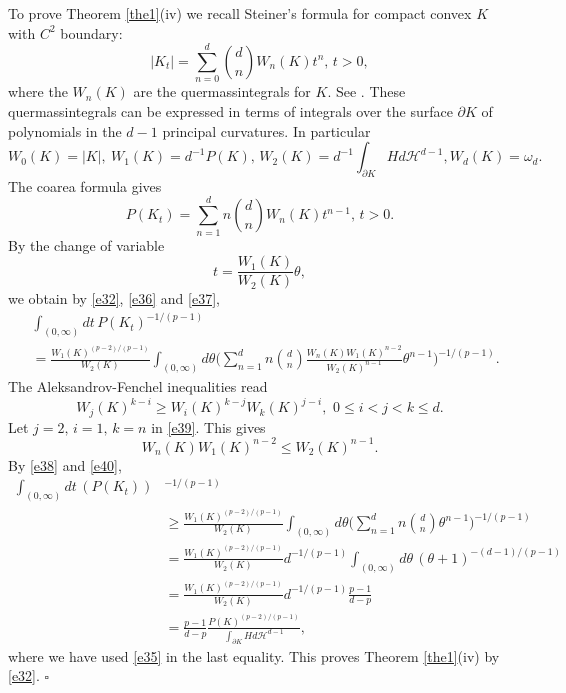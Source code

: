 \documentclass[a4paper,9pt]{article}
\begin{document}
To prove Theorem \ref{the1}(iv) we recall Steiner's formula for compact convex $K$ with $C^2$ boundary:
\begin{equation*}%
|K_t|=\sum_{n=0}^d \binom{d}{n} W_n(K)t^n,\,t>0,
\end{equation*}
where the $W_n(K)$ are the quermassintegrals for $K$. See \cite[Chapter 4(4.1)]{RS}.
These quermassintegrals can be expressed in terms of integrals over the surface $\partial K$ of polynomials in the $d-1$ principal curvatures.
In particular
\begin{equation}\label{e35}
W_0(K)=|K|, \ W_1(K)=d^{-1}P(K),\, W_2(K)=d^{-1}\int_{\partial K} Hd\mathcal{H}^{d-1}, W_d(K)=\omega_d.
\end{equation}
The coarea formula gives
\begin{equation}\label{e36}
P(K_t)=\sum_{n=1}^d n\binom{d}{n} W_n(K)t^{n-1},\,t>0.
\end{equation}
By the change of variable
\begin{equation}\label{e37}
t=\frac{W_1(K)}{W_2(K)}\theta,
\end{equation}
we obtain by \eqref{e32}, \eqref{e36} and \eqref{e37},
\begin{align}\label{e38}
&\int_{(0,\infty)}dt\, P(K_t)^{-1/(p-1)}\nonumber\\& =\frac{W_1(K)^{(p-2)/(p-1)}}{W_2(K)}\int_{(0,\infty)}d\theta \Big(\sum_{n=1}^d n\binom{d}{n} \frac{W_n(K)W_1(K)^{n-2}}{W_2(K)^{n-1}}\theta^{n-1}\Big)^{-1/(p-1)}.
\end{align}
The Aleksandrov-Fenchel inequalities \cite[(7.66)]{RS} read
\begin{equation}\label{e39}
W_j(K)^{k-i}\ge W_i(K)^{k-j}W_k(K)^{j-i},\,\,0\le i<j<k\le d.
\end{equation}
Let $j=2,\,i=1,\,k=n$ in \eqref{e39}. This gives
\begin{equation}\label{e40}
W_n(K)W_1(K)^{n-2}\le W_2(K)^{n-1}.
\end{equation}
By \eqref{e38} and \eqref{e40},
\begin{align*}%
\int_{(0,\infty)}dt\, (P(K_t))&^{-1/(p-1)}\nonumber\\&
\ge\frac{W_1(K)^{(p-2)/(p-1)}}{W_2(K)}\int_{(0,\infty)}d\theta \Big(\sum_{n=1}^d n\binom{d}{n} \theta^{n-1}\Big)^{-1/(p-1)}\nonumber\\&
=\frac{W_1(K)^{(p-2)/(p-1)}}{W_2(K)}d^{-1/(p-1)}\int_{(0,\infty)}d\theta \,(\theta+1)^{-(d-1)/(p-1)}\nonumber\\&
=\frac{W_1(K)^{(p-2)/(p-1)}}{W_2(K)}d^{-1/(p-1)}\frac{p-1}{d-p}\nonumber\\&
=\frac{p-1}{d-p}\frac{P(K)^{(p-2)/(p-1)}}{\int_{\partial K} Hd\mathcal{H}^{d-1}},
\end{align*}
where we have used \eqref{e35} in the last equality. This proves Theorem \ref{the1}(iv) by \eqref{e32}.
\hspace*{\fill }$\square $
\end{document}
